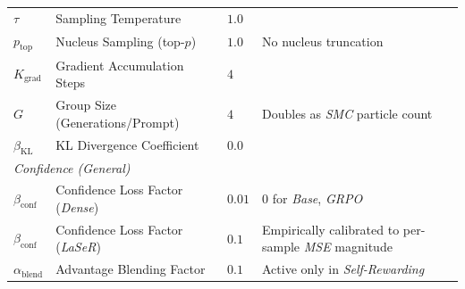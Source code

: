 \documentclass[a4paper,oneside,10pt,english]{scrbook}
\DeclareRobustCommand{\acfit}[1]{\textit{\ac{#1}}}
\begin{document}
\begin{landscape}
\begin{longtable}{l l >{\raggedright\arraybackslash}p{4.3cm} >{\raggedright\arraybackslash}p{8.3cm}}
		$\tau$                                  & Sampling Temperature                    & $1.0$                                                                                  &                                                                                              \\
		$p_{\mathrm{top}}$                      & Nucleus Sampling (top-$p$)              & $1.0$                                                                                  & No nucleus truncation                                                                        \\
		$K_{\mathrm{grad}}$                     & Gradient Accumulation Steps             & $4$                                                                                    &                                                                                              \\
		$G$                                     & Group Size (Generations/Prompt)         & $4$                                                                                    & Doubles as \acfit{SMC} particle count                                                        \\
		$\beta_{\mathrm{KL}}$                   & KL Divergence Coefficient               & $0.0$                                                                                  &                                                                                              \\
		\midrule
		\multicolumn{4}{l}{\textit{Confidence (General)}}                                                                                                                                                                                                                         \\
		$\beta_{\mathrm{conf}}$                 & Confidence Loss Factor (\textit{Dense}) & $0.01$                                                                                 & $0$ for \textit{Base}, \acfit{GRPO}                                                          \\
		$\beta_{\mathrm{conf}}$                 & Confidence Loss Factor (\acfit{LaSeR})  & $0.1$                                                                                  & Empirically calibrated to per-sample \acfit{MSE} magnitude                                   \\
		$\alpha_{\mathrm{blend}}$               & Advantage Blending Factor               & $0.1$                                                                                  & Active only in \textit{Self-Rewarding}                                                       \\

\end{longtable}
\end{landscape}
\end{document}
